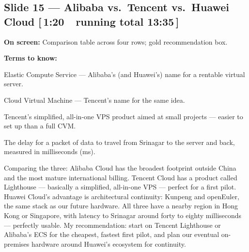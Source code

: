 \documentclass[11pt]{article}
\newcommand{\onscreen}[1]{\noindent\textbf{\color{sovGrey}On screen:} #1\par\vspace{4pt}}
\newcommand{\timing}[2]{\hfill{\normalsize\color{sovGrey}[\,#1\ \textbar\ running total #2\,]}}
\newenvironment{terms}
  {\noindent\textbf{\color{sovGrey}Terms to know:}
   \begin{description}[leftmargin=0pt,style=sameline,labelindent=0pt,itemsep=2pt,topsep=2pt,font=\normalfont\bfseries\color{sovDark}]}
  {\end{description}\vspace{2pt}}
\begin{document}
\subsection*{Slide 15 --- Alibaba vs.\ Tencent vs.\ Huawei Cloud \timing{1:20}{13:35}}
\onscreen{Comparison table across four rows; gold recommendation box.}
\begin{terms}
  \item[ECS] Elastic Compute Service --- Alibaba's (and Huawei's) name for a rentable
    virtual server.
  \item[CVM] Cloud Virtual Machine --- Tencent's name for the same idea.
  \item[Lighthouse] Tencent's simplified, all-in-one VPS product aimed at small
    projects --- easier to set up than a full CVM.
  \item[Latency] The delay for a packet of data to travel from Srinagar to the server
    and back, measured in milliseconds (ms).
\end{terms}
\begin{sayit}
Comparing the three: Alibaba Cloud has the broadest footprint outside China and the most
mature international billing. Tencent Cloud has a product called Lighthouse ---
basically a simplified, all-in-one VPS --- perfect for a first pilot. Huawei Cloud's
advantage is architectural continuity: Kunpeng and openEuler, the same stack as our
future hardware. All three have a nearby region in Hong Kong or Singapore, with latency
to Srinagar around forty to eighty milliseconds --- perfectly usable. My recommendation:
start on Tencent Lighthouse or Alibaba's ECS for the cheapest, fastest first pilot, and
plan our eventual on-premises hardware around Huawei's ecosystem for continuity.
\end{sayit}
\end{document}
